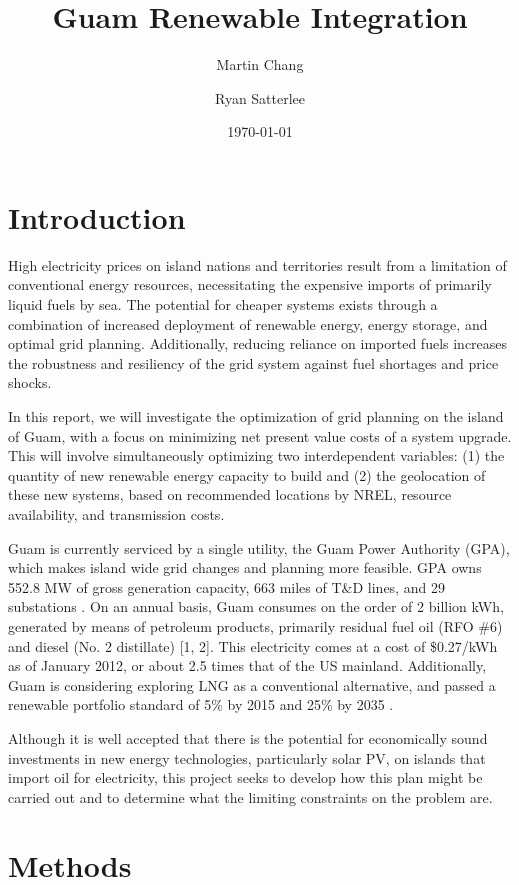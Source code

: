 \documentclass[12pt,letterpaper,fleqn]{report}
\title{Guam Renewable Integration}
\author{Martin Chang \and Ryan Satterlee}
\date{\today}
\begin{document}
\maketitle

\section{Introduction}

High electricity prices on island nations and territories result from
a limitation of conventional energy resources, necessitating the
expensive imports of primarily liquid fuels by sea. The potential for
cheaper systems exists through a combination of increased deployment
of renewable energy, energy storage, and optimal grid
planning. Additionally, reducing reliance on imported fuels increases
the robustness and resiliency of the grid system against fuel
shortages and price shocks.

In this report, we will investigate the optimization of grid planning
on the island of Guam, with a focus on minimizing net present value
costs of a system upgrade. This will involve simultaneously optimizing
two interdependent variables: (1) the quantity of new renewable energy
capacity to build and (2) the geolocation of these new systems, based
on recommended locations by NREL, resource availability, and
transmission costs.

Guam is currently serviced by a single utility, the Guam Power
Authority (GPA), which makes island wide grid changes and planning
more feasible. GPA owns 552.8 MW of gross generation capacity, 663
miles of T\&D lines, and 29 substations \cite{gpa14a}. On an
annual basis, Guam consumes on the order of 2 billion kWh, generated
by means of petroleum products, primarily residual fuel oil (RFO \#6)
and diesel (No. 2 distillate) [1, 2]. This electricity comes at a cost
of \$0.27/kWh as of January 2012, or about 2.5 times that of the US
mainland. Additionally, Guam is considering exploring LNG as a
conventional alternative, and passed a renewable portfolio standard of
5\% by 2015 and 25\% by 2035 \cite{eia12}.

Although it is well accepted that there is the potential for
economically sound investments in new energy technologies,
particularly solar PV, on islands that import oil for electricity,
this project seeks to develop how this plan might be carried out and
to determine what the limiting constraints on the problem are.

\section{Methods}
\end{document}
